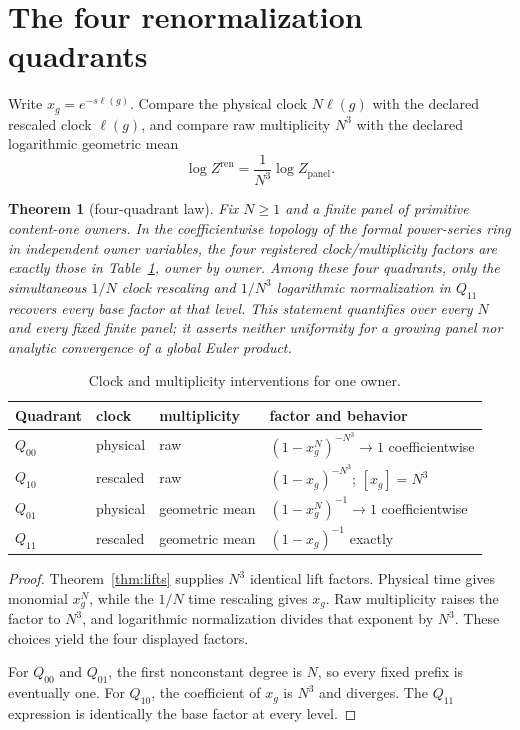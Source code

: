 \documentclass[11pt]{article}
\newtheorem{theorem}{Theorem}[section]
\theoremstyle{definition}
\theoremstyle{remark}
\begin{document}
\section{The four renormalization quadrants}

Write $x_g=e^{-s\ell(g)}$. Compare the physical clock $N\ell(g)$ with the declared rescaled clock $\ell(g)$, and compare raw multiplicity $N^3$ with the declared logarithmic geometric mean
\[
\log Z^{\mathrm{ren}}=\frac1{N^3}\log Z_{\mathrm{panel}}.
\]

\begin{theorem}[four-quadrant law]\label{thm:quadrants}
Fix $N\geq1$ and a finite panel of primitive content-one owners. In the coefficientwise topology of the formal power-series ring in independent owner variables, the four registered clock/multiplicity factors are exactly those in Table~\ref{tab:quadrants}, owner by owner. Among these four quadrants, only the simultaneous $1/N$ clock rescaling and $1/N^3$ logarithmic normalization in $Q_{11}$ recovers every base factor at that level. This statement quantifies over every $N$ and every fixed finite panel; it asserts neither uniformity for a growing panel nor analytic convergence of a global Euler product.
\end{theorem}

\begin{table}[ht]
\centering
\caption{Clock and multiplicity interventions for one owner.}
\label{tab:quadrants}
\begin{tabular}{llll}
\toprule
Quadrant & clock & multiplicity & factor and behavior\\
\midrule
$Q_{00}$ & physical & raw & $(1-x_g^N)^{-N^3}\to1$ coefficientwise\\
$Q_{10}$ & rescaled & raw & $(1-x_g)^{-N^3}$; $[x_g]=N^3$\\
$Q_{01}$ & physical & geometric mean & $(1-x_g^N)^{-1}\to1$ coefficientwise\\
$Q_{11}$ & rescaled & geometric mean & $(1-x_g)^{-1}$ exactly\\
\bottomrule
\end{tabular}
\end{table}

\begin{proof}
Theorem~\ref{thm:lifts} supplies $N^3$ identical lift factors. Physical time gives monomial $x_g^N$, while the $1/N$ time rescaling gives $x_g$. Raw multiplicity raises the factor to $N^3$, and logarithmic normalization divides that exponent by $N^3$. These choices yield the four displayed factors.

For $Q_{00}$ and $Q_{01}$, the first nonconstant degree is $N$, so every fixed prefix is eventually one. For $Q_{10}$, the coefficient of $x_g$ is $N^3$ and diverges. The $Q_{11}$ expression is identically the base factor at every level.
\end{proof}
\end{document}
